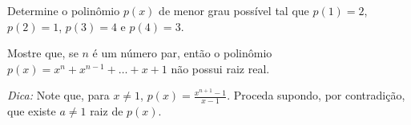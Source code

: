 \begin{exercise}
    Determine o polinômio $p(x)$ de menor grau possível tal que
$p(1) = 2$, $p(2)=1$, $p(3) = 4$ e $p(4) = 3$.
\end{exercise}

\begin{exercise}
Mostre que, se $n$ é um número par, então o polinômio $p(x) =
x^n + x^{n-1} + \dots + x+1$ não possui raiz real.

\noindent \emph{Dica: } Note que, para $x \neq 1$, $p(x) =
\frac{x^{n+1}-1}{x-1}$. Proceda supondo, por contradição, que existe
$a \neq 1$ raiz de $p(x)$.
\end{exercise}